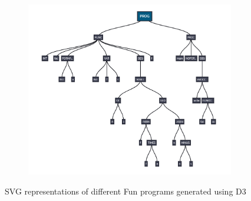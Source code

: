 \documentclass{l4proj}
\begin{document}
\begin{figure}[h]
\begin{subfigure}[b]{.33\textwidth}
		\centering
		\includegraphics[width=.8\linewidth]{images/implast3.PNG}
	\end{subfigure}	
	\caption{SVG representations of different Fun programs generated using D3}
	\label{fig:implast}	
\end{figure}
\end{document}
